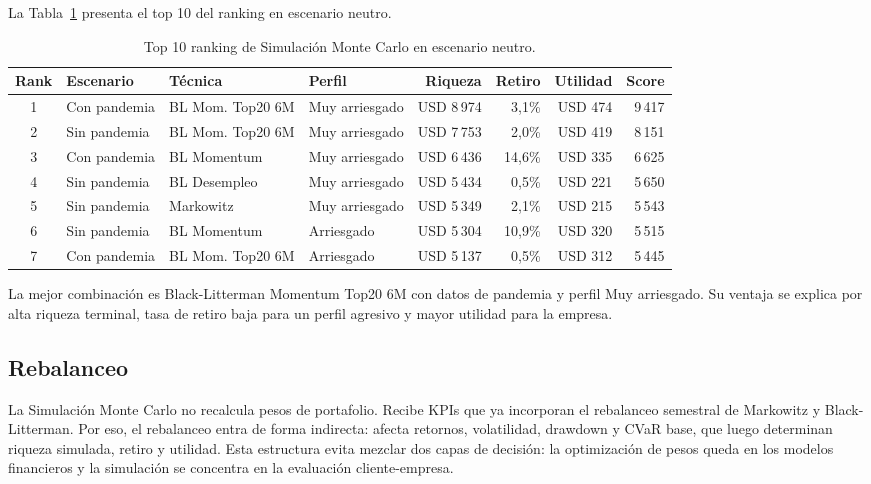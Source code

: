 La Tabla~\ref{tab:anexo4_ranking} presenta el top 10 del ranking en escenario
neutro.

\begin{table}[H]
\centering
\caption{Top 10 ranking de Simulaci\'on Monte Carlo en escenario neutro.}
\label{tab:anexo4_ranking}
\footnotesize
\begin{adjustbox}{max width=\textwidth}
\begin{tabular}{@{}clllrrrr@{}}
\toprule
Rank & Escenario & T\'ecnica & Perfil & Riqueza & Retiro & Utilidad & Score \\
\midrule
1 & Con pandemia & BL Mom. Top20 6M & Muy arriesgado & USD 8\,974 & 3,1\% & USD 474 & 9\,417 \\
2 & Sin pandemia & BL Mom. Top20 6M & Muy arriesgado & USD 7\,753 & 2,0\% & USD 419 & 8\,151 \\
3 & Con pandemia & BL Momentum & Muy arriesgado & USD 6\,436 & 14,6\% & USD 335 & 6\,625 \\
4 & Sin pandemia & BL Desempleo & Muy arriesgado & USD 5\,434 & 0,5\% & USD 221 & 5\,650 \\
5 & Sin pandemia & Markowitz & Muy arriesgado & USD 5\,349 & 2,1\% & USD 215 & 5\,543 \\
6 & Sin pandemia & BL Momentum & Arriesgado & USD 5\,304 & 10,9\% & USD 320 & 5\,515 \\
7 & Con pandemia & BL Mom. Top20 6M & Arriesgado & USD 5\,137 & 0,5\% & USD 312 & 5\,445 \\
\bottomrule
\end{tabular}
\end{adjustbox}
\end{table}

La mejor combinaci\'on es Black-Litterman Momentum Top20 6M con datos de
pandemia y perfil Muy arriesgado. Su ventaja se explica por alta riqueza
terminal, tasa de retiro baja para un perfil agresivo y mayor utilidad para la
empresa.

\subsection*{Rebalanceo}

La Simulaci\'on Monte Carlo no recalcula pesos de portafolio. Recibe KPIs que ya
incorporan el rebalanceo semestral de Markowitz y Black-Litterman. Por eso, el
rebalanceo entra de forma indirecta: afecta retornos, volatilidad, drawdown y
CVaR base, que luego determinan riqueza simulada, retiro y utilidad. Esta
estructura evita mezclar dos capas de decisi\'on: la optimizaci\'on de pesos queda
en los modelos financieros y la simulaci\'on se concentra en la evaluaci\'on
cliente-empresa.

